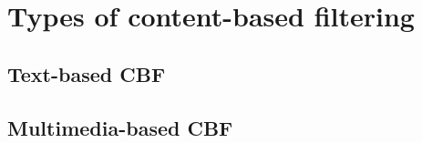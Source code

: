 \section{Types of content-based filtering}\label{sec:cbf_types}

\subsection{Text-based CBF} %

\subsection{Multimedia-based CBF} %